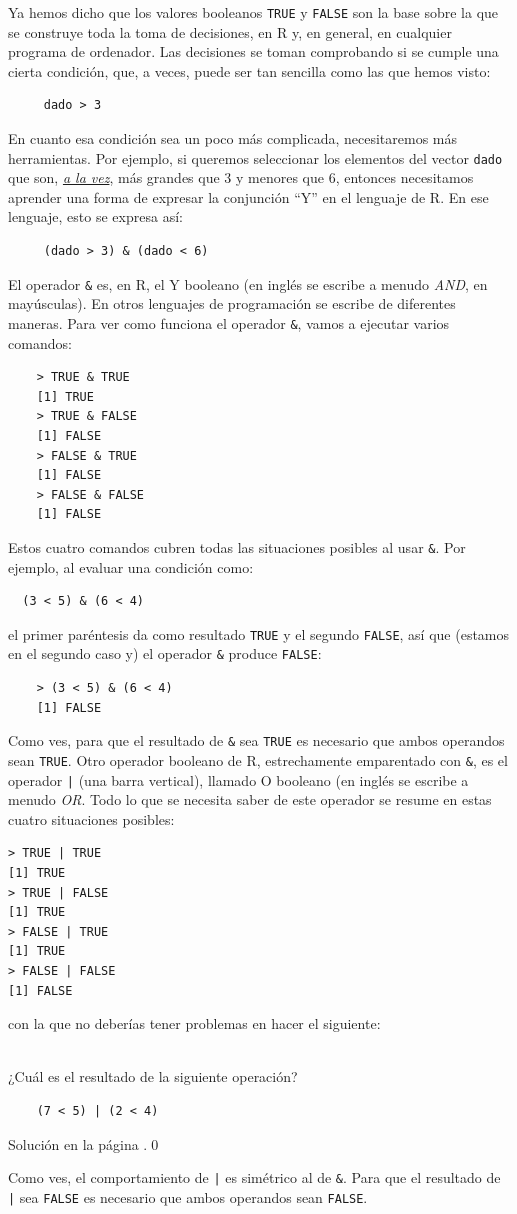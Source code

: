 \documentclass[10pt,a4paper]{article}\usepackage[]{graphicx}\usepackage[]{color}
\begin{document}
Ya hemos dicho que los valores booleanos {\tt TRUE} y {\tt FALSE} son la base sobre la que se construye toda la toma de decisiones, en R y, en general, en cualquier programa de ordenador. Las decisiones se toman comprobando si se cumple una cierta condición, que, a veces, puede ser tan sencilla como las que hemos visto:
\begin{verbatim}
     dado > 3
\end{verbatim}
En cuanto esa condición sea un poco más complicada, necesitaremos más herramientas. Por ejemplo, si queremos seleccionar los elementos del vector {\tt dado} que son, \underline{\em a la vez}, más grandes que $3$ y menores que $6$, entonces necesitamos aprender una forma de expresar la conjunción ``Y'' en el lenguaje de R. En ese lenguaje, esto se expresa así:
\begin{verbatim}
     (dado > 3) & (dado < 6)
\end{verbatim}
El operador {\tt \&} es, en R, el {\sf Y booleano} (en inglés se escribe a menudo {\em AND}, en mayúsculas). En otros lenguajes de programación se escribe de diferentes maneras. Para ver como funciona el operador {\tt \&}, vamos a ejecutar varios comandos:
\begin{verbatim}
    > TRUE & TRUE
    [1] TRUE
    > TRUE & FALSE
    [1] FALSE
    > FALSE & TRUE
    [1] FALSE
    > FALSE & FALSE
    [1] FALSE
\end{verbatim}
Estos cuatro comandos cubren todas las situaciones posibles al usar {\tt \&}. Por ejemplo, al evaluar una condición como:
\begin{verbatim}
  (3 < 5) & (6 < 4)
\end{verbatim}
el primer paréntesis da como resultado {\tt TRUE} y el segundo {\tt FALSE}, así que (estamos en el segundo caso y) el operador {\tt \&} produce {\tt FALSE}:
\begin{verbatim}
    > (3 < 5) & (6 < 4)
    [1] FALSE
\end{verbatim}
Como ves, para que el resultado de {\tt \&} sea {\tt TRUE} es necesario que ambos operandos sean {\tt TRUE}.
Otro operador booleano de R, estrechamente emparentado con {\tt \&}, es el operador {\tt |} (una barra vertical), llamado {\sf O booleano} (en inglés se escribe a menudo {\em OR}. Todo lo que se necesita saber de este operador se resume en estas cuatro situaciones posibles:
\begin{verbatim}
> TRUE | TRUE
[1] TRUE
> TRUE | FALSE
[1] TRUE
> FALSE | TRUE
[1] TRUE
> FALSE | FALSE
[1] FALSE
\end{verbatim}
con la que no deberías tener problemas en hacer el siguiente:
\begin{ejercicio}
\label{tut02:ejercicio26}
\quad\\
¿Cuál es el resultado de la siguiente operación?
\begin{verbatim}
    (7 < 5) | (2 < 4)
\end{verbatim}
Solución en la página \pageref{tut02:ejercicio26:sol}.\qed
\end{ejercicio}
Como ves, el comportamiento de {\tt |} es simétrico al de {\tt \&}. Para que el resultado de {\tt |} sea {\tt FALSE} es necesario que ambos operandos sean {\tt FALSE}.
\end{document}
